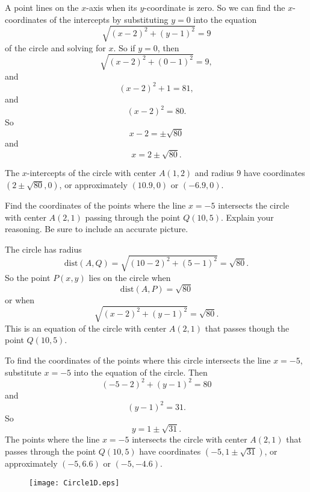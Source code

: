 \documentclass{ximera}
\begin{document}
\begin{explanation}
A point lines on the $x$-axis when its $y$-coordinate is zero. So we can find the $x$-coordinates of the intercepts by substituting $y=0$ into the equation
\[
\sqrt{(x-2)^2 + (y-1)^2} = 9 
\]
of the circle and solving for $x$. So if $y=0$, then
\[
\sqrt{(x-2)^2 + (0-1)^2} = 9,
\]
and
\[
   (x-2)^2 + 1 = 81,
\]
and
\[
   (x-2)^2 = 80.
\]
So
\[
    x-2 = \pm \sqrt{80}
\]
and 
\[
  x = 2\pm \sqrt{80} .
\]

The $x$-intercepts of the circle with center $A(1,2)$ and radius $9$ have coordinates $(2\pm \sqrt{80}, 0)$, or approximately $(10.9,0)$ or $(-6.9,0)$.

\iffalse   %

\begin{figure}[!h]
\centerline{
\texttt{[image: Circle1C.eps]}   
}
\end{figure}

\fi  %


\end{explanation}


\iffalse        %

\begin{example}  \label{Ex4}
Find the coordinates of the points where the line $x=-5$ intersects the circle with center $A(2,1)$ passing through the point $Q(10,5)$. Explain your reasoning. Be sure to include an accurate picture.
\end{example}

\begin{explanation}
The circle has radius
\[
   \text{dist}(A,Q) = \sqrt{(10-2)^2  + (5-1)^2} = \sqrt{80} .
\]
So the point $P(x,y)$ lies on the circle when
\[
  \text{dist}(A,P) = \sqrt{80}
\]
or when
\[
   \sqrt{(x-2)^2 +(y-1)^2} = \sqrt{80} .
\]
This is an equation of the circle with center $A(2,1)$ that passes though the point $Q(10,5)$.

To find the coordinates of the points where this circle intersects the line $x=-5$, substitute $x=-5$ into the equation of the circle. Then 
\[
       (-5-2)^2 + (y-1)^2 = 80
\]
and
\[ 
     (y-1)^2 = 31 .
\]
So
\[
     y = 1 \pm \sqrt{31} .
\]
The points where the line $x=-5$ intersects the circle with center $A(2,1)$ that passes through the point $Q(10,5)$ have coordinates $(-5, 1\pm \sqrt{31})$, or approximately $(-5, 6.6)$ or $(-5,-4.6)$.


\begin{figure}[!h]
\centerline{
\texttt{[image: Circle1D.eps]}   
}
\end{figure}


\end{explanation}
\end{document}
